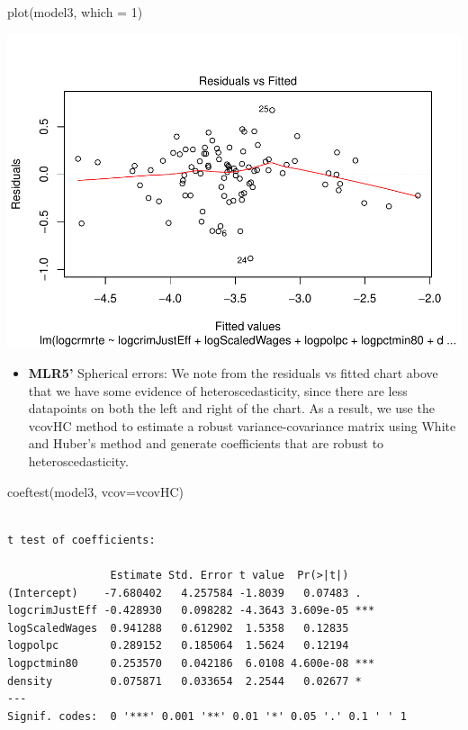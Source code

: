 \documentclass[]{article}
\newenvironment{Shaded}{}{}
\newcommand{\DataTypeTok}[1]{#1}
\newcommand{\DecValTok}[1]{#1}
\newcommand{\KeywordTok}[1]{\textcolor[rgb]{0.00,0.00,1.00}{#1}}
\newcommand{\NormalTok}[1]{#1}
\providecommand{\tightlist}{%
  \setlength{\itemsep}{0pt}\setlength{\parskip}{0pt}}
\begin{document}
\begin{Shaded}
\begin{Highlighting}[]
\KeywordTok{plot}\NormalTok{(model3, }\DataTypeTok{which =} \DecValTok{1}\NormalTok{)}
\end{Highlighting}
\end{Shaded}

\includegraphics{Bagnard_Gaustad_Hartman_Leung_Lab_3_files/figure-latex/unnamed-chunk-85-1.pdf}

\begin{itemize}
\tightlist
\item
  \textbf{MLR5'} Spherical errors: We note from the residuals vs fitted
  chart above that we have some evidence of heteroscedasticity, since
  there are less datapoints on both the left and right of the chart. As
  a result, we use the vcovHC method to estimate a robust
  variance-covariance matrix using White and Huber's method and generate
  coefficients that are robust to heteroscedasticity.
\end{itemize}

\begin{Shaded}
\begin{Highlighting}[]
\KeywordTok{coeftest}\NormalTok{(model3, }\DataTypeTok{vcov=}\NormalTok{vcovHC)}
\end{Highlighting}
\end{Shaded}

\begin{verbatim}

t test of coefficients:

                Estimate Std. Error t value  Pr(>|t|)    
(Intercept)    -7.680402   4.257584 -1.8039   0.07483 .  
logcrimJustEff -0.428930   0.098282 -4.3643 3.609e-05 ***
logScaledWages  0.941288   0.612902  1.5358   0.12835    
logpolpc        0.289152   0.185064  1.5624   0.12194    
logpctmin80     0.253570   0.042186  6.0108 4.600e-08 ***
density         0.075871   0.033654  2.2544   0.02677 *  
---
Signif. codes:  0 '***' 0.001 '**' 0.01 '*' 0.05 '.' 0.1 ' ' 1
\end{verbatim}
\end{document}
